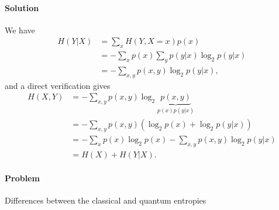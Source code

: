 \documentclass[hyperref, a4paper]{article}
\begin{document}
\paragraph{Solution} We have 
\begin{equation}
    \begin{aligned}
        H(Y | X) &= \sum_x H(Y, X = x) p(x) \\
        &= - \sum_x p(x) \sum_y p(y | x) \log_2 p(y | x) \\
        &= - \sum_{x, y} p(x, y) \log_{2} p(y | x),
    \end{aligned}
\end{equation}
and a direct verification gives 
\begin{equation}
    \begin{aligned}
        H(X, Y) &= - \sum_{x, y} p(x, y) \log_{2} \underbrace{p(x , y)}_{p(x) p(y | x)} \\
        &= - \sum_{x, y} p(x, y) (\log_2 p(x) + \log_2 p(y | x)) \\
        &= - \sum_{x} p(x) \log_2 p(x) - \sum_{x, y} p(x, y) \log_2 p(y | x) \\
        &= H(X) + H(Y | X).
    \end{aligned}
\end{equation}

\paragraph{Problem} Differences between the classical and quantum entropies 
\end{document}
